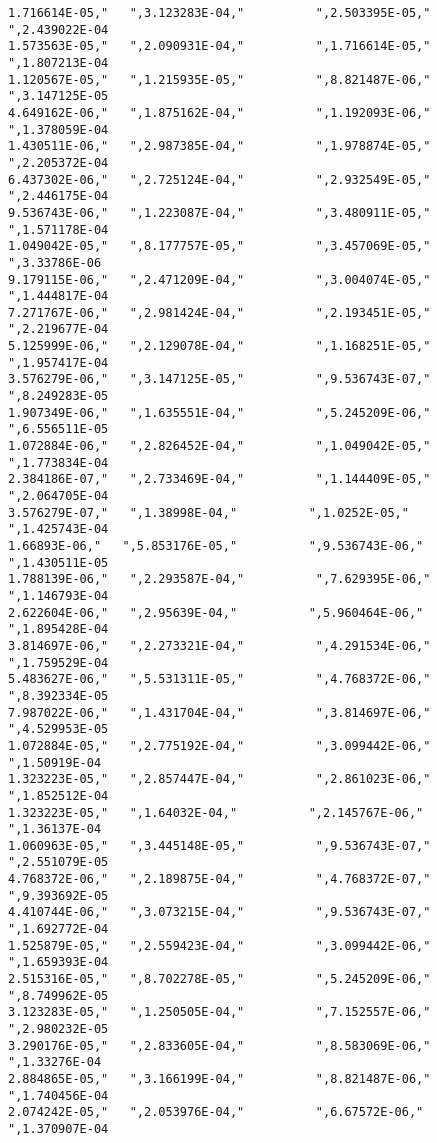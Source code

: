 {\begin{verbatim}
1.716614E-05,"   ",3.123283E-04,"          ",2.503395E-05,"   ",2.439022E-04
1.573563E-05,"   ",2.090931E-04,"          ",1.716614E-05,"   ",1.807213E-04
1.120567E-05,"   ",1.215935E-05,"          ",8.821487E-06,"   ",3.147125E-05
4.649162E-06,"   ",1.875162E-04,"          ",1.192093E-06,"   ",1.378059E-04
1.430511E-06,"   ",2.987385E-04,"          ",1.978874E-05,"   ",2.205372E-04
6.437302E-06,"   ",2.725124E-04,"          ",2.932549E-05,"   ",2.446175E-04
9.536743E-06,"   ",1.223087E-04,"          ",3.480911E-05,"   ",1.571178E-04
1.049042E-05,"   ",8.177757E-05,"          ",3.457069E-05,"   ",3.33786E-06
9.179115E-06,"   ",2.471209E-04,"          ",3.004074E-05,"   ",1.444817E-04
7.271767E-06,"   ",2.981424E-04,"          ",2.193451E-05,"   ",2.219677E-04
5.125999E-06,"   ",2.129078E-04,"          ",1.168251E-05,"   ",1.957417E-04
3.576279E-06,"   ",3.147125E-05,"          ",9.536743E-07,"   ",8.249283E-05
1.907349E-06,"   ",1.635551E-04,"          ",5.245209E-06,"   ",6.556511E-05
1.072884E-06,"   ",2.826452E-04,"          ",1.049042E-05,"   ",1.773834E-04
2.384186E-07,"   ",2.733469E-04,"          ",1.144409E-05,"   ",2.064705E-04
3.576279E-07,"   ",1.38998E-04,"          ",1.0252E-05,"   ",1.425743E-04
1.66893E-06,"   ",5.853176E-05,"          ",9.536743E-06,"   ",1.430511E-05
1.788139E-06,"   ",2.293587E-04,"          ",7.629395E-06,"   ",1.146793E-04
2.622604E-06,"   ",2.95639E-04,"          ",5.960464E-06,"   ",1.895428E-04
3.814697E-06,"   ",2.273321E-04,"          ",4.291534E-06,"   ",1.759529E-04
5.483627E-06,"   ",5.531311E-05,"          ",4.768372E-06,"   ",8.392334E-05
7.987022E-06,"   ",1.431704E-04,"          ",3.814697E-06,"   ",4.529953E-05
1.072884E-05,"   ",2.775192E-04,"          ",3.099442E-06,"   ",1.50919E-04
1.323223E-05,"   ",2.857447E-04,"          ",2.861023E-06,"   ",1.852512E-04
1.323223E-05,"   ",1.64032E-04,"          ",2.145767E-06,"   ",1.36137E-04
1.060963E-05,"   ",3.445148E-05,"          ",9.536743E-07,"   ",2.551079E-05
4.768372E-06,"   ",2.189875E-04,"          ",4.768372E-07,"   ",9.393692E-05
4.410744E-06,"   ",3.073215E-04,"          ",9.536743E-07,"   ",1.692772E-04
1.525879E-05,"   ",2.559423E-04,"          ",3.099442E-06,"   ",1.659393E-04
2.515316E-05,"   ",8.702278E-05,"          ",5.245209E-06,"   ",8.749962E-05
3.123283E-05,"   ",1.250505E-04,"          ",7.152557E-06,"   ",2.980232E-05
3.290176E-05,"   ",2.833605E-04,"          ",8.583069E-06,"   ",1.33276E-04
2.884865E-05,"   ",3.166199E-04,"          ",8.821487E-06,"   ",1.740456E-04
2.074242E-05,"   ",2.053976E-04,"          ",6.67572E-06,"   ",1.370907E-04

\end{verbatim}}
